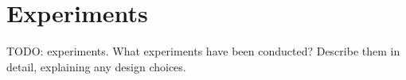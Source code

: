 \chapter{Experiments}\label{chap:experiments}

TODO: experiments. What experiments have been conducted? Describe them in detail, explaining any design choices.

